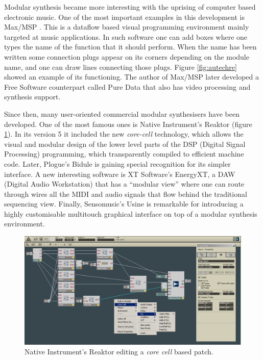 Modular synthesis became more interesting with the uprising of
computer based electronic music. One of the most important examples in
this development is Max/MSP \cite{puckete2002max}. This is a dataflow
based visual programming environment mainly targeted at music
applications. In such software one can add boxes where one types the
name of the function that it should perform. When the name has been
written some connection plugs appear on its corners depending on the
module name, and one can draw lines connecting those plugs. Figure
\ref{fig:autechre} showed an example of its functioning. The author of
Max/MSP later developed a Free Software counterpart called Pure
Data\cite{puckette96puredata} that also has video processing
and synthesis support.

Since then, many user-oriented commercial modular synthesisers have
been developed. One of the most famous ones is Native Instrument's
Reaktor (figure \ref{fig:reaktor}). In its version 5 it included the
new \emph{core-cell} technology, which allows the visual and modular
design of the lower level parts of the DSP (Digital Signal
Processing) programming, which transparently compiled to efficient
machine code. Later, Plogue's Bidule is gaining special recognition
for its simpler interface. A new interesting software is XT Software's
EnergyXT, a DAW (Digital Audio Workstation) that has a ``modular
view'' where one can route through wires all the MIDI and audio
signals that flow behind the traditional sequencing view. Finally,
Sensomusic's Usine is remarkable for introducing a highly customisable
multitouch graphical interface on top of a modular synthesis
environment.

\begin{figure}[h!]
\centering
\includegraphics[width=.9\textwidth]{pic/reaktor.jpg}
\caption{Native Instrument's Reaktor editing a \emph{core cell} based
  patch.}
\label{fig:reaktor}
\end{figure}

